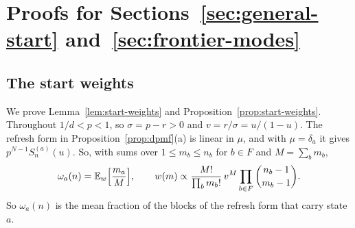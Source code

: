 \section{\texorpdfstring{Proofs for Sections~\ref{sec:general-start}
and~\ref{sec:frontier-modes}}{Proofs for the start and the field}}\label{app:start-field}

\subsection{The start weights}

We prove Lemma~\ref{lem:start-weights} and
Proposition~\ref{prop:start-weights}. Throughout $1/d<p<1$, so $\sigma=p-r>0$
and $v=r/\sigma=u/(1-u)$. The refresh form in Proposition~\ref{prop:dpmf}(a) is
linear in $\mu$, and with $\mu=\delta_a$ it gives $p^{N-1}S^{(a)}_n(u)$. So, with
sums over $1\le m_b\le n_b$ for $b\in F$ and $M=\sum_bm_b$,
\begin{equation}\label{eq:startw-weights}
 \omega_a(n)=\mathbb E_w\Bigl[\frac{m_a}M\Bigr],\qquad
 w(m)\propto\frac{M!}{\prod_bm_b!}\,v^M\prod_{b\in F}\binom{n_b-1}{m_b-1}.
\end{equation}
So $\omega_a(n)$ is the mean fraction of the blocks of the refresh form
that carry state $a$.

